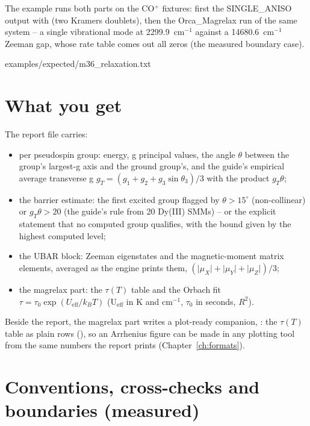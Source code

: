 The example runs both parts on the CO$^+$ fixtures: first the
SINGLE\_ANISO output with  (two Kramers doublets), then the
Orca\_Magrelax run of the same system -- a single vibrational mode at
2299.9~cm$^{-1}$ against a 14680.6~cm$^{-1}$ Zeeman gap, whose rate
table comes out all zeros (the measured boundary case).


  {examples/expected/m36_relaxation.txt}

\section{What you get}

The report file  carries:

\begin{itemize}
  \item per pseudospin group: energy, g principal values, the angle
    $\theta$ between the group's largest-g axis and the ground group's, and
    the guide's empirical average transverse g
    $g_T = (g_1 + g_2 + g_3 \sin\theta_3)/3$ with the product $g_T\theta$;
  \item the barrier estimate: the first excited group flagged by
    $\theta > 15^\circ$ (non-collinear) or $g_T\theta > 20$ (the guide's
    rule from 20 Dy(III) SMMs) -- or the explicit statement that no
    computed group qualifies, with the bound given by the highest computed
    level;
  \item the UBAR block: Zeeman eigenstates and the magnetic-moment matrix
    elements, averaged as the engine prints them,
    $(\lvert\mu_X\rvert + \lvert\mu_Y\rvert + \lvert\mu_Z\rvert)/3$;
  \item the magrelax part: the $\tau(T)$ table and the Orbach fit
    $\tau = \tau_0 \exp(U_{\mathrm{eff}}/k_BT)$ (U$_{\mathrm{eff}}$ in K
    and cm$^{-1}$, $\tau_0$ in seconds, $R^2$).
\end{itemize}

Beside the report, the magrelax part writes a plot-ready companion,
: the $\tau(T)$ table as plain rows
(), so an Arrhenius figure can be
made in any plotting tool from the same numbers the report prints
(Chapter~\ref{ch:formats}).

\section{Conventions, cross-checks and boundaries (measured)}

